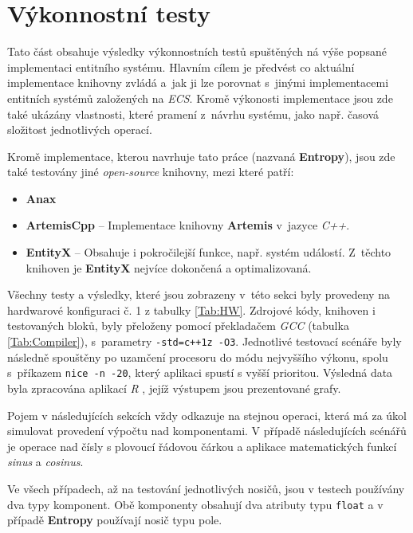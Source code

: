 \section{Výkonnostní testy}

Tato část obsahuje výsledky výkonnostních testů spuštěných ná výše popsané implementaci entitního systému. Hlavním cílem je předvést co aktuální implementace knihovny zvládá a~jak ji lze porovnat s~jinými implementacemi entitních systémů založených na \emph{ECS}. Kromě výkonosti implementace jsou zde také ukázány vlastnosti, které pramení z~návrhu systému, jako např. časová složitost jednotlivých operací.

Kromě implementace, kterou navrhuje tato práce (nazvaná \textbf{Entropy}), jsou zde také testovány jiné \emph{open-source} knihovny, mezi které patří:
\begin{itemize}
	\item \textbf{Anax} \cite{Anax}
	\item \textbf{ArtemisCpp} \cite{ArtemisCpp} -- Implementace knihovny \textbf{Artemis} \cite{ArtemisJava} v~jazyce \emph{C++}.
	\item \textbf{EntityX} \cite{EntityX} -- Obsahuje i pokročilejší funkce, např. systém událostí. Z~těchto knihoven je \textbf{EntityX} nejvíce dokončená a optimalizovaná.
\end{itemize}

Všechny testy a výsledky, které jsou zobrazeny v~této sekci byly provedeny na hardwarové konfiguraci č. 1 z tabulky \ref{Tab:HW}. Zdrojové kódy, knihoven i testovaných bloků, byly přeloženy pomocí překladačem \emph{GCC} (tabulka \ref{Tab:Compiler}), s~parametry \texttt{-std=c++1z -O3}. Jednotlivé testovací scénáře byly následně spouštěny po uzamčení procesoru do módu nejvyššího výkonu, spolu s~příkazem \texttt{nice -n -20}, který aplikaci spustí s vyšší prioritou. Výsledná data byla zpracována aplikací \emph{R} \cite{RHome}, jejíž výstupem jsou prezentované grafy.

Pojem  v následujících sekcích vždy odkazuje na stejnou operaci, která má za úkol simulovat provedení výpočtu nad komponentami. V případě následujících scénářů je  operace nad čísly s plovoucí řádovou čárkou a aplikace matematických funkcí \emph{sinus} a \emph{cosinus}.

Ve všech případech, až na testování jednotlivých nosičů, jsou v testech používány dva typy komponent. Obě komponenty obsahují dva atributy typu \texttt{float} a v případě \textbf{Entropy} používají nosič typu pole. 

